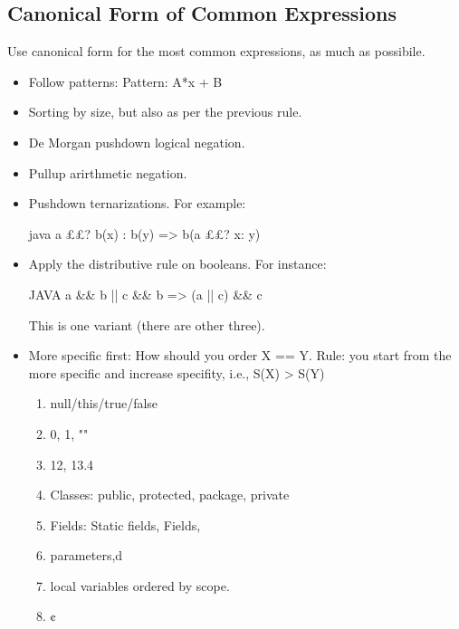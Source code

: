 \subsection{Canonical Form of Common Expressions}
Use canonical form for the most common expressions, as much as possibile.
\begin{itemize}
  \item Follow patterns: Pattern: A*x + B
  \item Sorting by size, but also as per the previous rule.
  \item De Morgan pushdown logical negation.
  \item Pullup arirthmetic negation.
  \item Pushdown ternarizations. For example:
        \begin{code}{java}
a ££? b(x) : b(y) => b(a ££? x: y)
  \end{code}
  \item Apply the distributive rule on booleans. For instance:
        \begin{code}{JAVA}
a && b || c && b => (a || c) && c
  \end{code}
  This is one variant (there are other three).
  \item More specific first: How should you order X == Y.
        Rule: you start from the more specific and increase specifity, i.e.,
        S(X) > S(Y)
        \begin{enumerate}
          \item null/this/true/false
          \item 0, 1, ""
          \item 12, 13.4
          \item Classes: public, protected, package, private
          \item Fields: Static fields, Fields,
          \item parameters,d
          \item local variables ordered by scope.
          \item ¢
        \end{enumerate}
\end{itemize}

